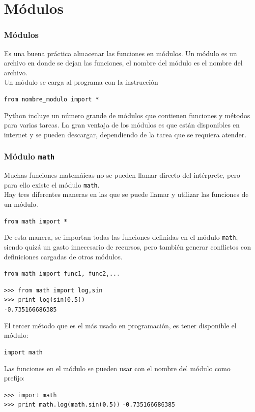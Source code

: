 \section{Módulos}
\begin{frame}[fragile]
\frametitle{Módulos}
Es una buena práctica almacenar las funciones en módulos. Un módulo es un archivo en donde se dejan las funciones, el nombre del módulo es el nombre del archivo.
\\
\bigskip
Un módulo se carga al programa con la instrucción
\begin{center}
\verb|from nombre_modulo import *|
\end{center}
Python incluye un número grande de módulos que contienen funciones y métodos para varias tareas. La gran ventaja de los módulos es que están disponibles en internet y se pueden descargar, dependiendo de la tarea que se requiera atender.
\end{frame}
\begin{frame}[fragile]
\frametitle{Módulo \texttt{math}}
Muchas funciones matemáicas no se pueden llamar directo del intérprete, pero para ello existe el módulo \texttt{math}.
\\
\bigskip
Hay tres diferentes maneras en las que se puede llamar y utilizar las funciones de un módulo.
\begin{exampleblock}{}
\verb|from math import *|
\end{exampleblock}
De esta manera, se importan todas las funciones definidas en el módulo \texttt{math}, siendo quizá un gasto innecesario de recursos, pero también generar conflictos con definiciones cargadas de otros módulos.
\end{frame}
\begin{frame}[fragile]
\begin{exampleblock}{}
\verb|from math import func1, func2,...|
\end{exampleblock}
\pause
\begin{exampleblock}{}
\verb|>>> from math import log,sin| \\
\verb|>>> print log(sin(0.5))| \\
\verb|-0.735166686385|
\end{exampleblock}
\end{frame}
\begin{frame}[fragile]
El tercer método que es el más usado en programación, es tener disponible el módulo:
\begin{center}
\verb|import math|
\end{center}
Las funciones en el módulo se pueden usar con el nombre del módulo como prefijo:
\begin{exampleblock}{}
\verb|>>> import math| \\
\verb|>>> print math.log(math.sin(0.5))|
\verb|-0.735166686385|
\end{exampleblock}
\end{frame}
